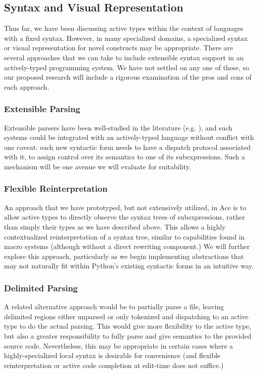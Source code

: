 \subsection{Syntax and Visual Representation}
Thus far, we have been discussing active types within the context of languages with a fixed syntax. However, in many specialized domains, a specialized syntax or visual representation for novel constructs may be appropriate. There are several approaches that we can take to include extensible syntax support in an actively-typed programming system. We have not settled on any one of these, so our proposed research will include a rigorous examination of the pros and cons of each approach.

\subsubsection{Extensible Parsing} 
Extensible parsers have been well-studied in the literature (e.g. \cite{journals/entcs/BrabrandSV03}), and such systems could be integrated with an actively-typed language without conflict with one caveat: each new syntactic form needs to have a dispatch protocol associated with it, to assign control over its semantics to one of its subexpressions. Such a mechanism will be one avenue we will evaluate for suitability.

\subsubsection{Flexible Reinterpretation}
An approach that we have prototyped, but not extensively utilized, in Ace is to allow active types to directly observe the syntax trees of subexpressions, rather than simply their types as we have described above. This allows a highly contextualized reinterpretation of a syntax tree, similar to capabilities found in macro systems (although without a direct rewriting component.) We will further explore this approach, particularly as we begin implementing abstractions that may not naturally fit within Python's existing syntactic forms in an intuitive way.

\subsubsection{Delimited Parsing}
A related alternative approach would be to partially parse a file, leaving delimited regions either unparsed or only tokenized and dispatching to an active type to do the actual parsing. This would give more flexibility to the active type, but also a greater responsibility to fully parse and give semantics to the provided source code. Nevertheless, this may be appropriate in certain cases where a highly-specialized local syntax is desirable for convenience (and flexible reinterpretation or active code completion at edit-time does not suffice.)

